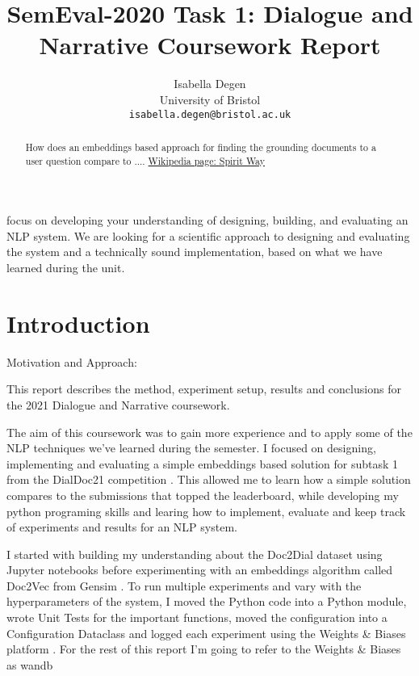\documentclass[11pt]{article}
\title{SemEval-2020 Task 1: Dialogue and Narrative Coursework Report}
\author{Isabella Degen \\ University of Bristol \\ {\tt isabella.degen@bristol.ac.uk}}
\date{}
\begin{document}
    \maketitle

    \begin{abstract}
        How does an embeddings based approach for finding the grounding documents to a user question compare to ....
        \href{https://en.m.wikipedia.org/wiki/Spirit_way}{Wikipedia page: Spirit Way}

    \end{abstract}

    focus on developing your understanding of designing,  building,  and evaluating an NLP system.
    We are looking for a scientific approach to designing and evaluating the system and a technically sound implementation,
    based on what we have learned during the unit.


    \section{Introduction}\label{sec:introduction}
    Motivation and Approach:

    This report describes the method, experiment setup, results and conclusions for the 2021 Dialogue and Narrative
    coursework.

    The aim of this coursework was to gain more experience and to apply some of the NLP techniques we've learned during
    the semester. I focused on designing, implementing and evaluating a simple embeddings based solution for
    subtask 1 from the DialDoc21
    competition \cite{feng-etal-2020-doc2dial}.
    This allowed me to learn how a simple solution compares to the submissions that topped the leaderboard,
    while developing my python programing skills and
    learing how to implement, evaluate and keep track of experiments and results for an NLP system.

    I started with building my understanding about the Doc2Dial dataset \cite{feng-etal-2020-doc2dial} using Jupyter notebooks
    before experimenting with an embeddings algorithm called Doc2Vec from Gensim \cite{rehurek_lrec}.
    To run multiple experiments and vary with the hyperparameters of the system,
    I moved the Python code into a Python module, wrote Unit Tests for the important functions, moved the configuration
    into a Configuration Dataclass and logged each experiment using
    the Weights \& Biases platform \cite{wandb}. For the rest of this report I'm going to refer to the Weights \& Biases
    as wandb
\end{document}
